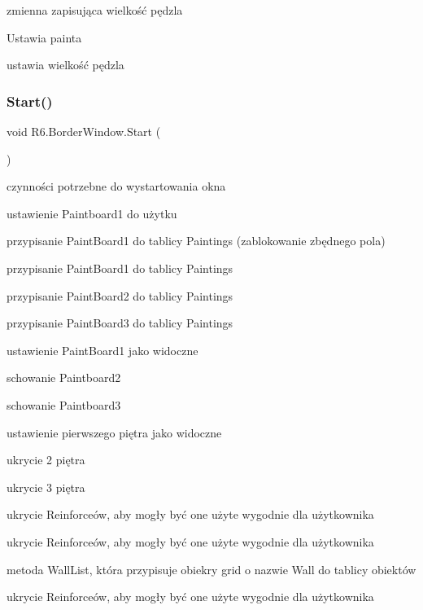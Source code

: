 zmienna zapisująca wielkość pędzla 

Ustawia painta 

ustawia wielkość pędzla \mbox{\label{class_r6_1_1_border_window_a877d358b0f63cb293a1ea410865d83b5}} 
\subsubsection{\texorpdfstring{Start()}{Start()}}
{\footnotesize\ttfamily void R6.\+Border\+Window.\+Start (\begin{DoxyParamCaption}{ }\end{DoxyParamCaption})\hspace{0.3cm}{\ttfamily [private]}}



czynności potrzebne do wystartowania okna 

ustawienie Paintboard1 do użytku 

przypisanie Paint\+Board1 do tablicy Paintings (zablokowanie zbędnego pola) 

przypisanie Paint\+Board1 do tablicy Paintings 

przypisanie Paint\+Board2 do tablicy Paintings 

przypisanie Paint\+Board3 do tablicy Paintings 

ustawienie Paint\+Board1 jako widoczne 

schowanie Paintboard2 

schowanie Paintboard3 

ustawienie pierwszego piętra jako widoczne 

ukrycie 2 piętra 

ukrycie 3 piętra 

ukrycie Reinforceów, aby mogły być one użyte wygodnie dla użytkownika 

ukrycie Reinforceów, aby mogły być one użyte wygodnie dla użytkownika 

metoda Wall\+List, która przypisuje obiekry grid o nazwie Wall do tablicy obiektów 

ukrycie Reinforceów, aby mogły być one użyte wygodnie dla użytkownika \mbox{\label{class_r6_1_1_border_window_a0fe611ab2eca4d594bd706026a7f48c2}} 
